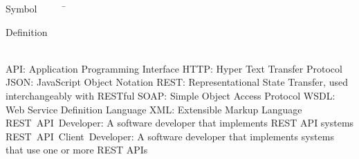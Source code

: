 

\begin{tabbing}
Symbol~~~~~\= \ \ \ \ \ \ \ \ \ \ \ \ \ \ \ \ \ \ \ \ \ \ \ \ \ \ \ \ \ \ \ \ \ \ \ \  \parbox{5in}{Definition}\\

\addsymbol \mbox{API}: {Application Programming Interface}
\addsymbol \mbox{HTTP}: {Hyper Text Transfer Protocol}
\addsymbol \mbox{JSON}: {JavaScript Object Notation}
\addsymbol \mbox{REST}: {Representational State Transfer, used interchangeably with RESTful}
\addsymbol \mbox{SOAP}: {Simple Object Access Protocol}
\addsymbol \mbox{WSDL}: {Web Service Definition Language}
\addsymbol \mbox{XML}: {Extensible Markup Language}
\addsymbol \mbox{REST API Developer}: {A software developer that implements REST API systems}
\addsymbol \mbox{REST API Client Developer}: {A software developer that implements systems that use one or more REST APIs}





\end{tabbing}
